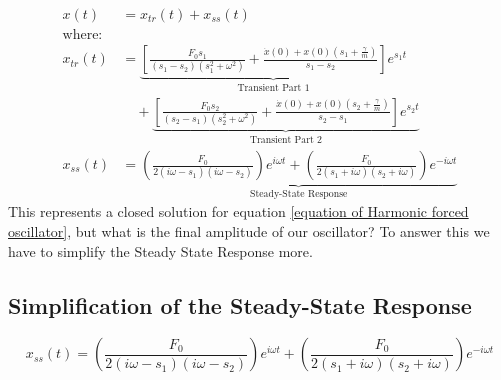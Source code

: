 \documentclass[10pt,twoside]{report}
\begin{document}
\begin{align*}
    x(t) &= x_{tr}(t) + x_{ss}(t) \\[10pt]
    \text{where:} \\
    x_{tr}(t) &= \underbrace{\left[ \frac{F_0 s_1}{(s_1 - s_2)(s_1^2 + \omega^2)} + \frac{\dot{x}(0) + x(0) ( s_1 + \frac{\gamma}{m} )}{s_1 - s_2} \right] e^{s_1 t}}_{\text{Transient Part 1}} \\
    &\quad + \underbrace{\left[ \frac{F_0 s_2}{(s_2 - s_1)(s_2^2 + \omega^2)} + \frac{\dot{x}(0) + x(0) ( s_2 + \frac{\gamma}{m} )}{s_2 - s_1} \right] e^{s_2 t}}_{\text{Transient Part 2}} \\[15pt]
    x_{ss}(t) &= \underbrace{\left(\frac{F_0}{2(i\omega - s_1)(i\omega - s_2)}\right)e^{i\omega t} + \left(\frac{F_0}{2(s_1 + i\omega)(s_2 + i\omega)}\right)e^{-i\omega t}}_{\text{Steady-State Response}}
\end{align*}
This represents a closed solution for equation \eqref{equation of Harmonic forced oscillator}, but what is the final amplitude of our oscillator? To answer this we have to simplify the Steady State Response more.

\subsection{Simplification of the Steady-State Response}

\begin{equation*}
    x_{ss}(t) = \left(\frac{F_0}{2(i\omega - s_1)(i\omega - s_2)}\right)e^{i\omega t} + \left(\frac{F_0}{2(s_1 + i\omega)(s_2 + i\omega)}\right)e^{-i\omega t}
\end{equation*}
\end{document}
